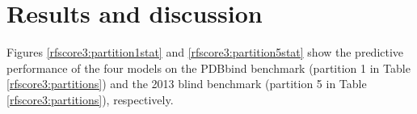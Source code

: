 \section{Results and discussion}

Figures \ref{rfscore3:partition1stat} and \ref{rfscore3:partition5stat} show the predictive performance of the four models on the PDBbind benchmark (partition 1 in Table \ref{rfscore3:partitions}) and the 2013 blind benchmark (partition 5 in Table \ref{rfscore3:partitions}), respectively.

\begin{figure}
\centering
{}
\\
\end{figure}
